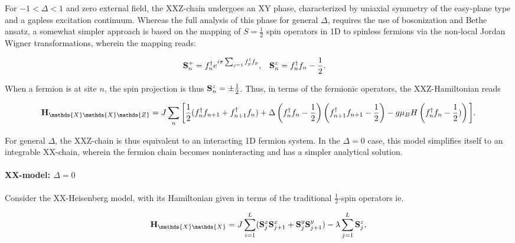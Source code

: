 \documentclass{homework}
\begin{document}
For $-1 < \Delta < 1$ and zero external field, the XXZ-chain undergoes an XY phase, characterized by uniaxial symmetry of the easy-plane type and a gapless excitation continuum. Whereas the full analysis of this phase for general $\Delta$, requires the use of bosonization and Bethe ansatz, a somewhat simpler approach is based on the mapping of $S = \frac{1}{2}$ spin operators in 1D to spinless fermions via the non-local Jordan Wigner transformations, wherein the mapping reads:

\begin{align}
    {\bf S}_{n}^+ &= f_n^\dagger e^{i\pi \sum_{j = 1} f_p^\dagger f_p}, & {\bf S}_n^z &= f_n^\dagger f_n - \frac{1}{2}.
\end{align}

When a fermion is at site $n$, the spin projection is thus ${\bf S}_n^z = \pm \frac{1}{2}$. Thus, in terms of the fermionic operators, the XXZ-Hamiltonian reads 

\begin{equation}
    {\bf H}_{\mathds{X}\mathds{X}\mathds{Z}} = J \sum_{n} \bigg[ \frac{1}{2} (f_n^\dagger f_{n+1} + f_{n+1}^\dagger f_n) + \Delta \left(f_n^\dagger f_n - \frac{1}{2}\right) \left(f_{n+1}^\dagger f_{n+1} - \frac{1}{2}\right) - g\mu_B H \left(f_n^\dagger f_n - \frac{1}{2})\right) \bigg].
    \label{XXZ fermionic hamiltonian}
\end{equation}

For general $\Delta$, the XXZ-chain is thus equivalent to an interacting 1D fermion system. In the $\Delta = 0$ case, this model simplifies itself to an integrable XX-chain, wherein the fermion chain becomes noninteracting and has a simpler analytical solution. \\

\paragraph{XX-model: $\Delta = 0$ }

Consider the XX-Heisenberg model, with its Hamiltonian given in terms of the traditional $\frac{1}{2}$-spin operators ie. 

\begin{equation}
    {\bf H}_{\mathds{X}\mathds{X}} = J \sum_{i=1}^{L} ({\bf S}_{j}^{x} {\bf S}_{j+1}^{x} + {\bf S}_{j}^{y} {\bf S}_{j+1}^{y}) - \lambda \sum_{j=1}^{L} {\bf S}_{j}^{z},
    \label{XX hamiltonian}
\end{equation}
\end{document}
